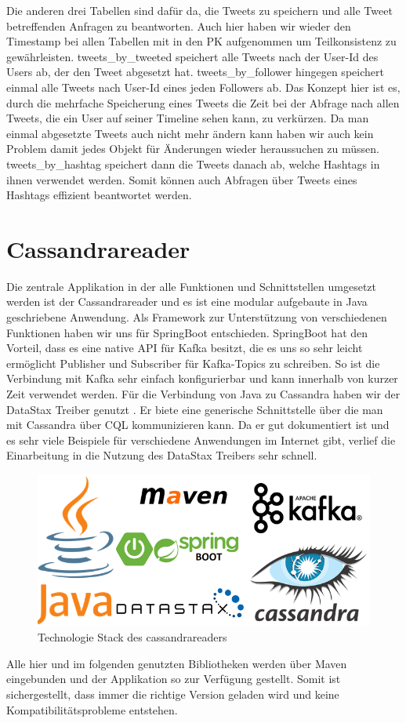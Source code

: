 Die anderen drei Tabellen sind dafür da, die Tweets zu speichern und alle Tweet betreffenden Anfragen zu beantworten. Auch hier haben wir wieder den Timestamp bei allen Tabellen mit in den PK aufgenommen um Teilkonsistenz zu gewährleisten. tweets\_by\_tweeted speichert alle Tweets nach der User-Id des Users ab, der den Tweet abgesetzt hat. tweets\_by\_follower hingegen speichert einmal alle Tweets nach User-Id eines jeden Followers ab. Das Konzept hier ist es, durch die mehrfache Speicherung eines Tweets die Zeit bei der Abfrage nach allen Tweets, die ein User auf seiner Timeline sehen kann, zu verkürzen. Da man einmal abgesetzte Tweets auch nicht mehr ändern kann haben wir auch kein Problem damit jedes Objekt für Änderungen wieder heraussuchen zu müssen. tweets\_by\_hashtag speichert dann die Tweets danach ab, welche Hashtags in ihnen verwendet werden. Somit können auch Abfragen über Tweets eines Hashtags effizient beantwortet werden.

\section{Cassandrareader}
Die zentrale Applikation in der alle Funktionen und Schnittstellen umgesetzt werden ist der Cassandrareader und es ist eine modular aufgebaute in Java geschriebene Anwendung. Als Framework zur Unterstützung von verschiedenen Funktionen haben wir uns für SpringBoot entschieden. SpringBoot hat den Vorteil, dass es eine native API für Kafka besitzt, die es uns so sehr leicht ermöglicht Publisher und Subscriber für Kafka-Topics zu schreiben. So ist die Verbindung mit Kafka sehr einfach konfigurierbar und kann innerhalb von kurzer Zeit verwendet werden. 
Für die Verbindung von Java zu Cassandra haben wir der DataStax Treiber genutzt \cite{DataStax}. Er biete eine generische Schnittstelle über die man mit Cassandra über CQL kommunizieren kann. Da er gut dokumentiert ist und es sehr viele Beispiele für verschiedene Anwendungen im Internet gibt, verlief die Einarbeitung in die Nutzung des DataStax Treibers sehr schnell.
\begin{figure}[htbp]
	\centering
	\includegraphics[scale=0.5]{pics/tech_stack.png}
	\caption{Technologie Stack des cassandrareaders}
	\label{fig:techStackCass}
\end{figure}
Alle hier und im folgenden genutzten Bibliotheken werden über Maven eingebunden und der Applikation so zur Verfügung gestellt. Somit ist sichergestellt, dass immer die richtige Version geladen wird und keine Kompatibilitätsprobleme entstehen.

